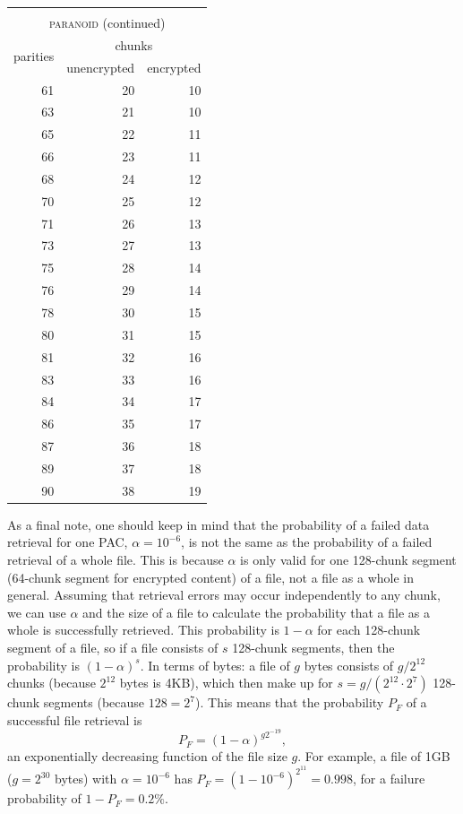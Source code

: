 \documentclass[manuscript,screen,review]{acmart}
\begin{document}
\begin{table}[!ht]
\begin{minipage}{.49\linewidth}
\end{minipage}
\begin{minipage}{.49\linewidth}
\centering
\begin{tabular}{|r|r|r|}
\multicolumn{3}{c}{\textsc{}}\\
\multicolumn{3}{c}{\textsc{paranoid} (continued)}\\\hline
\multirow{2}{1.5cm}{\centering 
 parities } 
&\multicolumn{2}{|c|}{ chunks }\\\cline{2-3}
&\multicolumn{1}{|c|}{unencrypted} 
&\multicolumn{1}{|c|}{encrypted} \\\hline\hline
61 & 20 & 10\\
63 & 21 & 10\\
65 & 22 & 11\\
66 & 23 & 11\\
68 & 24 & 12\\
70 & 25 & 12\\
71 & 26 & 13\\
73 & 27 & 13\\
75 & 28 & 14\\
76 & 29 & 14\\
78 & 30 & 15\\
80 & 31 & 15\\
81 & 32 & 16\\
83 & 33 & 16\\
84 & 34 & 17\\
86 & 35 & 17\\
87 & 36 & 18\\
89 & 37 & 18\\
90 & 38 & 19\\
\hline
\end{tabular}
\end{minipage}
\label{tbl:paranoid}
\end{table}

As a final note, one should keep in mind that the probability of a failed data retrieval for one PAC, $\alpha = 10^{-6}$, is not the same as the probability of a failed retrieval of a whole file. This is because $\alpha$ is only valid for one 128-chunk segment (64-chunk segment for encrypted content) of a file, not a file as a whole in general. Assuming that retrieval errors may occur independently to any chunk, we can use $\alpha$ and the size of a file to calculate the probability that a file as a whole is successfully retrieved. This probability is $1 - \alpha$ for each 128-chunk segment of a file, so if a file consists of $s$ 128-chunk segments, then the probability is $(1-\alpha)^s$. In terms of bytes: a file of $g$ bytes consists of $g / 2^{12}$ chunks (because $2^{12}$ bytes is 4KB), which then make up for $s = g / (2^{12} \cdot 2^{7})$ 128-chunk segments (because $128 = 2^7$). This means that the probability $P_F$ of a successful file retrieval is
\begin{equation}
  P_F = (1 - \alpha)^{g2^{-19}} ,
  \label{eq-P-file}
\end{equation}
an exponentially decreasing function of the file size $g$. For example, a file of 1GB ($g = 2^{30}$ bytes) with $\alpha = 10^{-6}$ has $P_F = (1 - 10^{-6})^{2^{11}} = 0.998$, for a failure probability of $1 - P_F = 0.2\%$.
\end{document}
